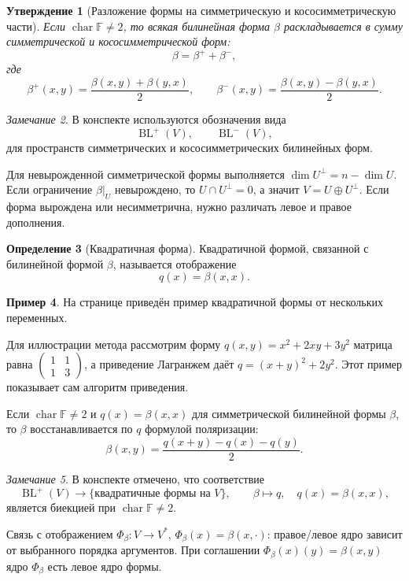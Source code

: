 \documentclass[12pt,a4paper]{article}
\theoremstyle{definition}
\newtheorem{definition}{Определение}[section]
\newtheorem{example}[definition]{Пример}
\theoremstyle{plain}
\newtheorem{proposition}[definition]{Утверждение}
\theoremstyle{remark}
\newtheorem{remark}[definition]{Замечание}
\newenvironment{knowledgefix}{\begin{clarifybox}}{\end{clarifybox}}
\newcommand{\F}{\mathbb{F}}
\newcommand{\BL}{\operatorname{BL}}
\begin{document}
\begin{proposition}[Разложение формы на симметрическую и кососимметрическую части]
Если $\operatorname{char}\F\ne2$, то всякая билинейная форма $\beta$ раскладывается в сумму симметрической и кососимметрической форм:
\[
    \beta=\beta^+ + \beta^-,
\]
где
\[
    \beta^+(x,y)=\frac{\beta(x,y)+\beta(y,x)}{2},
    \qquad
    \beta^-(x,y)=\frac{\beta(x,y)-\beta(y,x)}{2}.
\]
\end{proposition}

\begin{remark}
В конспекте используются обозначения вида
\[
    \BL^+(V),\qquad \BL^-(V),
\]
для пространств симметрических и кососимметрических билинейных форм.
\begin{knowledgefix}
Для невырожденной симметрической формы выполняется \(\dim U^\perp=n-\dim U\). Если ограничение \(\beta|_U\) невырождено, то \(U\cap U^\perp=0\), а значит \(V=U\oplus U^\perp\). Если форма вырождена или несимметрична, нужно различать левое и правое дополнения.
\end{knowledgefix}
\end{remark}


\begin{definition}[Квадратичная форма]
Квадратичной формой, связанной с билинейной формой $\beta$, называется отображение
\[
    q(x)=\beta(x,x).
\]
\end{definition}

\begin{example}
На странице приведён пример квадратичной формы от нескольких переменных.
\begin{knowledgefix}
Для иллюстрации метода рассмотрим форму \(q(x,y)=x^2+2xy+3y^2\) матрица равна \(\begin{pmatrix}1&1\\1&3\end{pmatrix}\), а приведение Лагранжем даёт \(q=(x+y)^2+2y^2\). Этот пример показывает сам алгоритм приведения.
\end{knowledgefix}
\end{example}

Если $\operatorname{char}\F\ne2$ и $q(x)=\beta(x,x)$ для симметрической билинейной формы $\beta$, то $\beta$ восстанавливается по $q$ формулой поляризации:
\[
    \beta(x,y)=\frac{q(x+y)-q(x)-q(y)}{2}.
\]

\begin{remark}
В конспекте отмечено, что соответствие
\[
    \BL^+(V)\longrightarrow \{\text{квадратичные формы на }V\},
    \qquad
    \beta\longmapsto q,\quad q(x)=\beta(x,x),
\]
является биекцией при $\operatorname{char}\F\ne2$.
\begin{knowledgefix}
Связь с отображением \(\Phi_\beta:V\to V^*\), \(\Phi_\beta(x)=\beta(x,\cdot)\): правое/левое ядро зависит от выбранного порядка аргументов. При соглашении \(\Phi_\beta(x)(y)=\beta(x,y)\) ядро \(\Phi_\beta\) есть левое ядро формы.
\end{knowledgefix}
\end{remark}
\end{document}
